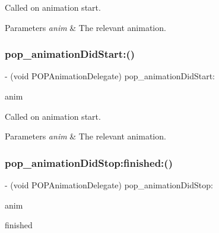 Called on animation start. 
\begin{DoxyParams}{Parameters}
{\em anim} & The relevant animation. \\
\hline
\end{DoxyParams}
\mbox{\label{protocol_p_o_p_animation_delegate_01-p_af4187aefc2cb3c5df86a10722872aef3}} 
\subsubsection{\texorpdfstring{pop\+\_\+animation\+Did\+Start\+:()}{pop\_animationDidStart:()}\hspace{0.1cm}{\footnotesize\ttfamily [3/3]}}
{\footnotesize\ttfamily -\/ (void P\+O\+P\+Animation\+Delegate) pop\+\_\+animation\+Did\+Start\+: \begin{DoxyParamCaption}\item[{(\mbox{\hyperlink{interface_p_o_p_animation}{P\+O\+P\+Animation}} $\ast$)}]{anim }\end{DoxyParamCaption}\hspace{0.3cm}{\ttfamily [optional]}}

Called on animation start. 
\begin{DoxyParams}{Parameters}
{\em anim} & The relevant animation. \\
\hline
\end{DoxyParams}
\mbox{\label{protocol_p_o_p_animation_delegate_01-p_a5c84da0fa9e5baf068c950be6a494c07}} 
\subsubsection{\texorpdfstring{pop\+\_\+animation\+Did\+Stop\+:finished\+:()}{pop\_animationDidStop:finished:()}\hspace{0.1cm}{\footnotesize\ttfamily [1/3]}}
{\footnotesize\ttfamily -\/ (void P\+O\+P\+Animation\+Delegate) pop\+\_\+animation\+Did\+Stop\+: \begin{DoxyParamCaption}\item[{(\mbox{\hyperlink{interface_p_o_p_animation}{P\+O\+P\+Animation}} $\ast$)}]{anim }\item[{finished:(B\+O\+OL)}]{finished }\end{DoxyParamCaption}\hspace{0.3cm}{\ttfamily [optional]}}


